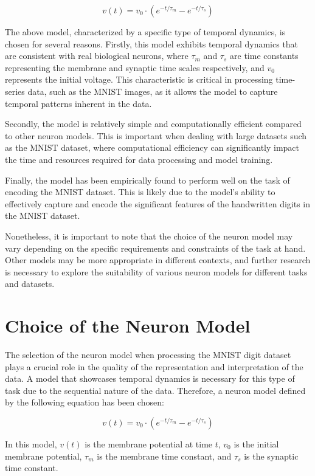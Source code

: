 \begin{equation}
    v(t) = v_0 \cdot (e^{-t/\tau_m} - e^{-t/\tau_s})
\end{equation}

The above model, characterized by a specific type of temporal dynamics, is chosen for several reasons. Firstly, this model exhibits temporal dynamics that are consistent with real biological neurons, where $\tau_m$ and $\tau_s$ are time constants representing the membrane and synaptic time scales respectively, and $v_0$ represents the initial voltage. This characteristic is critical in processing time-series data, such as the MNIST images, as it allows the model to capture temporal patterns inherent in the data.

Secondly, the model is relatively simple and computationally efficient compared to other neuron models. This is important when dealing with large datasets such as the MNIST dataset, where computational efficiency can significantly impact the time and resources required for data processing and model training.

Finally, the model has been empirically found to perform well on the task of encoding the MNIST dataset. This is likely due to the model's ability to effectively capture and encode the significant features of the handwritten digits in the MNIST dataset.

Nonetheless, it is important to note that the choice of the neuron model may vary depending on the specific requirements and constraints of the task at hand. Other models may be more appropriate in different contexts, and further research is necessary to explore the suitability of various neuron models for different tasks and datasets.


\section{Choice of the Neuron Model}
The selection of the neuron model when processing the MNIST digit dataset plays a crucial role in the quality of the representation and interpretation of the data. A model that showcases temporal dynamics is necessary for this type of task due to the sequential nature of the data. Therefore, a neuron model defined by the following equation has been chosen:

\begin{equation}
    v(t) = v_0 \cdot (e^{-t/\tau_m} - e^{-t/\tau_s})
\end{equation}

In this model, $v(t)$ is the membrane potential at time $t$, $v_0$ is the initial membrane potential, $\tau_m$ is the membrane time constant, and $\tau_s$ is the synaptic time constant.

